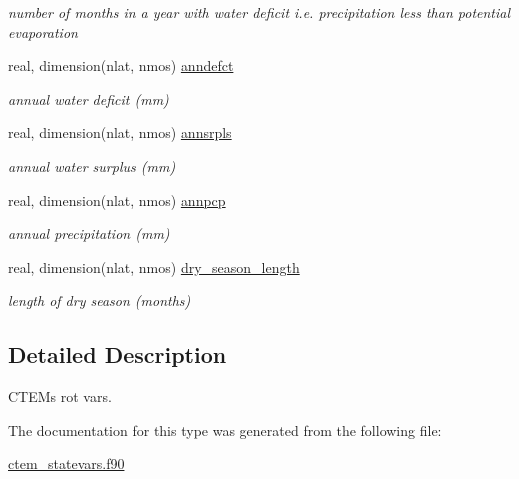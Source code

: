 \begin{DoxyCompactItemize}
\begin{DoxyCompactList}\small\item\em number of months in a year with water deficit i.\+e. precipitation less than potential evaporation \end{DoxyCompactList}\item 
\hypertarget{structctem__statevars_1_1veg__rot_a71bdbd015fa70ebf97e4732ec0bf0b80}{}real, dimension(nlat, nmos) \hyperlink{structctem__statevars_1_1veg__rot_a71bdbd015fa70ebf97e4732ec0bf0b80}{anndefct}\label{structctem__statevars_1_1veg__rot_a71bdbd015fa70ebf97e4732ec0bf0b80}

\begin{DoxyCompactList}\small\item\em annual water deficit (mm) \end{DoxyCompactList}\item 
\hypertarget{structctem__statevars_1_1veg__rot_a3aab440add68ccbda6cda9514827452e}{}real, dimension(nlat, nmos) \hyperlink{structctem__statevars_1_1veg__rot_a3aab440add68ccbda6cda9514827452e}{annsrpls}\label{structctem__statevars_1_1veg__rot_a3aab440add68ccbda6cda9514827452e}

\begin{DoxyCompactList}\small\item\em annual water surplus (mm) \end{DoxyCompactList}\item 
\hypertarget{structctem__statevars_1_1veg__rot_a33d8786af675b3730ad9137c6ce77d74}{}real, dimension(nlat, nmos) \hyperlink{structctem__statevars_1_1veg__rot_a33d8786af675b3730ad9137c6ce77d74}{annpcp}\label{structctem__statevars_1_1veg__rot_a33d8786af675b3730ad9137c6ce77d74}

\begin{DoxyCompactList}\small\item\em annual precipitation (mm) \end{DoxyCompactList}\item 
\hypertarget{structctem__statevars_1_1veg__rot_a24757068deba766b0e5ffb542a467bd8}{}real, dimension(nlat, nmos) \hyperlink{structctem__statevars_1_1veg__rot_a24757068deba766b0e5ffb542a467bd8}{dry\+\_\+season\+\_\+length}\label{structctem__statevars_1_1veg__rot_a24757068deba766b0e5ffb542a467bd8}

\begin{DoxyCompactList}\small\item\em length of dry season (months) \end{DoxyCompactList}\end{DoxyCompactItemize}


\subsection{Detailed Description}
C\+T\+E\+M\textquotesingle{}s \textquotesingle{}rot\textquotesingle{} vars. 

The documentation for this type was generated from the following file\+:\begin{DoxyCompactItemize}
\item 
\hyperlink{ctem__statevars_8f90}{ctem\+\_\+statevars.\+f90}\end{DoxyCompactItemize}
